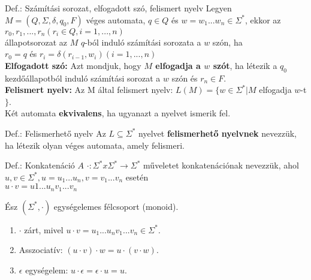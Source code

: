 \documentclass{beamer}
\begin{document}
\begin{frame}
\begin{block}{Def.: Számítási sorozat, elfogadott szó, felismert nyelv}
Legyen $M = (Q, {\Sigma}, {\delta}, q_0, F)$ véges automata, $q \in Q$ és $w = w_1...w_n \in {\Sigma}^*$, ekkor az\\
\medskip
$r_0, r_1, ..., r_n (r_i \in Q, i = 1, ..., n)$\\
\medskip
állapotsorozat az $M$ $q$-ból induló számítási sorozata a $w$ szón, ha\\
\medskip
$r_0 = q$ és $r_i = {\delta}(r_{i - 1}, w_i)(i = 1, ..., n)$\\
\bigskip
\textbf{Elfogadott szó:} Azt mondjuk, hogy \textbf{$M$ elfogadja a $w$ szót}, ha létezik a $q_0$ kezdőállapotból induló számítási sorozat a $w$ szón és $r_n \in F$.\\
\bigskip
\textbf{Felismert nyelv:} Az M által felismert nyelv: $L(M) = \{w \in {\Sigma}^* | M$ elfogadja $w$-t$\}$.\\
\bigskip
Két automata \textbf{ekvivalens}, ha ugyanazt a nyelvet ismerik fel.
\end{block}

\begin{block}{Def.: Felismerhető nyelv}
Az $L \subseteq {\Sigma}^*$ nyelvet \textbf{felismerhető nyelvnek} nevezzük, ha létezik olyan véges automata, amely felismeri.
\end{block}

\begin{block}{Def.: Konkatenáció}
$A$ $\cdot : {\Sigma}^* x {\Sigma}^* \rightarrow {\Sigma}^*$ műveletet konkatenációnak nevezzük, ahol\\
\medskip
$u, v \in {\Sigma}^*, u = u_1...u_n, v = v_1...v_n$ esetén\\
$u \cdot v = u1...u_nv_1...v_n$
\end{block}

\begin{block}{Ész}
$({\Sigma}^*, {\cdot})$ egységelemes félcsoport (monoid).\\
\begin{enumerate}
\item $\cdot$ zárt, mivel $u \cdot v = u_1...u_nv_1...v_n \in {\Sigma}^*$.
\item Asszociatív: $(u \cdot v) \cdot w = u \cdot (v \cdot w)$.
\item $\epsilon$ egységelem: $u \cdot \epsilon = \epsilon \cdot u = u$.
\end{enumerate}
\end{block}

\end{frame}
\end{document}
